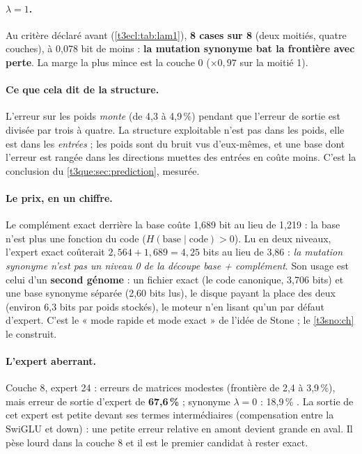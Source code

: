 \paragraph{$\lambda = 1$.} Au critère déclaré avant (\cref{t3ecl:tab:lam1}), \textbf{8 cases sur 8} (deux moitiés, quatre couches), à 0,078 bit de moins : \textbf{la mutation synonyme bat la frontière avec perte}. La marge la plus mince est la couche 0 ($\times 0{,}97$ sur la moitié 1).

\paragraph{Ce que cela dit de la structure.} L'erreur sur les poids \emph{monte} (de 4,3 à 4,9\,\%) pendant que l'erreur de sortie est divisée par trois à quatre. La structure exploitable n'est pas dans les poids, elle est dans les \emph{entrées} ; les poids sont du bruit vus d'eux-mêmes, et une base dont l'erreur est rangée dans les directions muettes des entrées en coûte moins. C'est la conclusion du \cref{t3que:sec:prediction}, mesurée.

\paragraph{Le prix, en un chiffre.} Le complément exact derrière la base coûte 1,689 bit au lieu de 1,219 : la base n'est plus une fonction du code ($H(\text{base}\mid\text{code}) > 0$). Lu en deux niveaux, l'expert exact coûterait $2{,}564 + 1{,}689 = 4{,}25$ bits au lieu de 3,86 \calc : \emph{la mutation synonyme n'est pas un niveau 0 de la découpe base + complément}. Son usage est celui d'un \textbf{second génome} : un fichier exact (le code canonique, 3,706 bits) et une base synonyme séparée (2,60 bits lus), le disque payant la place des deux (environ 6,3 bits par poids stockés), le moteur n'en lisant qu'un par défaut d'expert. C'est le « mode rapide et mode exact » de l'idée de Stone ; le \cref{t3sno:ch} le construit.

\paragraph{L'expert aberrant.} Couche 8, expert 24 : erreurs de matrices modestes (frontière de 2,4 à 3,9\,\%), mais erreur de sortie d'expert de \textbf{67,6\,\%} ; synonyme $\lambda = 0$ : 18,9\,\% \mes. La sortie de cet expert est petite devant ses termes intermédiaires (compensation entre la SwiGLU et down) : une petite erreur relative en amont devient grande en aval. Il pèse lourd dans la couche 8 et il est le premier candidat à rester exact.

